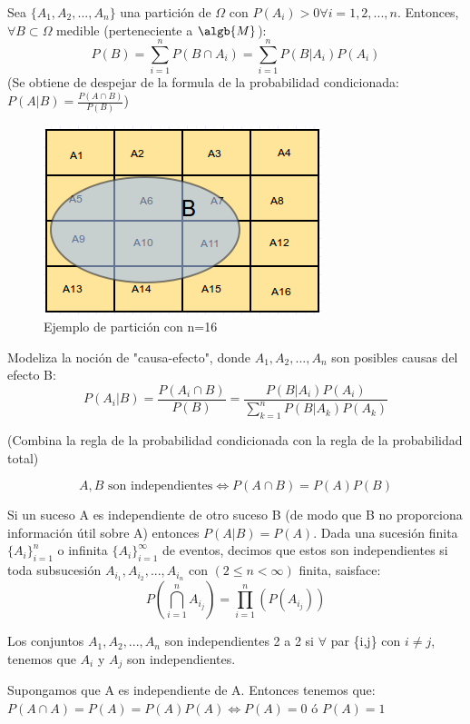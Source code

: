 \documentclass{apuntes}
\begin{document}
\begin{defn}
Sea  $\{A_1, A_2,...,A_n\}$ una partición de $\Omega$ con $P(A_i)>0 \forall i=1,2,...,n$. Entonces, $\forall B \subset \Omega$ medible (perteneciente a $\algb{M}$):
\[
P(B)=\sum_{i=1}^{n}P(B\cap A_i)=\sum_{i=1}^{n}P(B|A_i)P(A_i)
\]
(Se obtiene de despejar de la formula de la probabilidad condicionada: $P(A|B)=\frac{P(A \cap B)}{P(B)}$)
\end{defn}

\begin{figure}[h]
\centering
\includegraphics[page=1,scale=0.745]{img/Dvenn2.png}
\caption{Ejemplo de partición con n=16}
\end{figure}

\begin{defn}
Modeliza la noción de "causa-efecto", donde $A_1, A_2,...,A_n$ son posibles causas del efecto B:
\[
P(A_i|B)= \frac{P(A_i\cap B)}{P(B)}= \frac{P(B|A_i)P(A_i)}{\sum_{k=1}^{n}P(B|A_k)P(A_k)}
\]

(Combina la regla de la probabilidad condicionada con la regla de la probabilidad total)
\end{defn}

\begin{defn}[Independencia]
\[
A,B \text{ son independientes} \Leftrightarrow P(A \cap B)=P(A)P(B)
\]

\obs Si un suceso A es independiente de otro suceso B (de modo que B no proporciona información útil sobre A) entonces $P(A|B)=P(A)$.
\obs Dada una sucesión finita $\{A_i\}_{i=1}^{n}$ o infinita $\{A_i\}_{i=1}^\infty$ de eventos, decimos que estos son independientes si toda subsucesión $A_{i_1}, A_{i_2},..., A_{i_n}$ con $(2 \leq n < \infty)$ finita, saisface:
\[
P(\bigcap_{i=1}^nA_{i_j})=\prod_{i=1}^{n}(P(A_{i_j}))
\]

\obs Los conjuntos $A_1, A_2,...,A_n$ son independientes 2 a 2 si $\forall$ par \{i,j\} con $i \neq j$, tenemos que $A_i$ y $A_j$ son independientes.

\begin{example}
Supongamos que A es independiente de A. Entonces tenemos que: $P(A\cap A)=P(A)=P(A)P(A) \Leftrightarrow P(A)=0$ ó $P(A)=1$
\end{example}
\end{defn}
\end{document}
